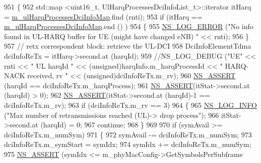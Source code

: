 \begin{DoxyCode}
951                         \{
952                                 std::map <uint16\_t, UlHarqProcessesDciInfoList\_t>::iterator itHarq = 
      \hyperlink{classns3_1_1MmWaveFlexTtiPfMacScheduler_a8b50ed4fc6df0561404f4aad5aa3d384}{m\_ulHarqProcessesDciInfoMap}.find (rnti);
953                                 \textcolor{keywordflow}{if} (itHarq == \hyperlink{classns3_1_1MmWaveFlexTtiPfMacScheduler_a8b50ed4fc6df0561404f4aad5aa3d384}{m\_ulHarqProcessesDciInfoMap}.end ()
      )
954                                 \{
955                                         \hyperlink{group__logging_ga0261a8db1d4ac5f79417d117634fd455}{NS\_LOG\_ERROR} (\textcolor{stringliteral}{"No info found in UL-HARQ buffer for UE
       (might have changed eNB) "} << rnti);
956                                 \}
957                                 \textcolor{comment}{// retx correspondent block: retrieve the UL-DCI}
958                                 DciInfoElementTdma dciInfoReTx = itHarq->second.at (harqId);
959                                 \textcolor{comment}{//NS\_LOG\_DEBUG ("UE" << rnti << " UL harqId " <<
       (unsigned)harqInfo.m\_harqProcessId << " HARQ-NACK received, rv " << (unsigned)dciInfoReTx.m\_rv);}
960                                 \hyperlink{assert_8h_a6dccdb0de9b252f60088ce281c49d052}{NS\_ASSERT} (harqId == dciInfoReTx.m\_harqProcess);
961                                 \hyperlink{assert_8h_a6dccdb0de9b252f60088ce281c49d052}{NS\_ASSERT}(itStat->second.at (harqId) > 0);
962                                 \hyperlink{assert_8h_a6dccdb0de9b252f60088ce281c49d052}{NS\_ASSERT}(itStat->second.at (harqId)-1 == dciInfoReTx.m\_rv);
963                                 \textcolor{keywordflow}{if} (dciInfoReTx.m\_rv == 3)
964                                 \{
965                                         \hyperlink{group__logging_gafbd73ee2cf9f26b319f49086d8e860fb}{NS\_LOG\_INFO} (\textcolor{stringliteral}{"Max number of retransmissions reached
       (UL)-> drop process"});
966                                         itStat->second.at (harqId) = 0;
967                                         \textcolor{keywordflow}{continue};
968                                 \}
969 
970                                 \textcolor{keywordflow}{if} (symAvail >= dciInfoReTx.m\_numSym)
971                                 \{
972                                         symAvail -= dciInfoReTx.m\_numSym;
973                                         dciInfoReTx.m\_symStart = symIdx;
974                                         symIdx += dciInfoReTx.m\_numSym;
975                                         \hyperlink{assert_8h_a6dccdb0de9b252f60088ce281c49d052}{NS\_ASSERT} (symIdx <= m\_phyMacConfig->GetSymbolsPerSubframe

\end{DoxyCode}
